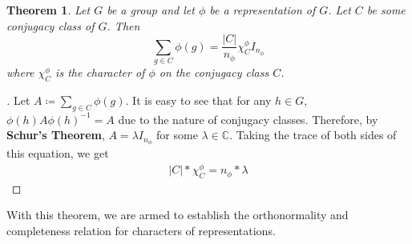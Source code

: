 \documentclass[10pt]{ucthesis}
\newcommand{\C}{\mathbb{C}}
\newtheorem{theorem}[definition]{Theorem}
\begin{document}
\begin{theorem}
	Let $G$ be a group and let $\phi$ be a representation of $G$. Let $C$ be some conjugacy class of $G$. Then 
$$\sum_{g\in C} \phi(g) =\frac{|C|}{n_\phi} \chi^\phi_C I_{n_\phi}$$
where $\chi^\phi_C$ is the character of $\phi$ on the conjugacy class $C$.
\end{theorem}
\begin{proof}[\cite{Tung}] Let $A\coloneq \sum_{g\in C} \phi(g)$. It is easy to see that for any $h\in G$, $\phi(h)A\phi(h)^{-1} = A$ due to the nature of conjugacy classes. Therefore, by \textbf{Schur's Theorem}, $A = \lambda I_{n_\phi}$ for some $\lambda \in \C$. Taking the trace of both sides of this equation, we get 
\begin{equation}
	\begin{aligned}
		|C| * \chi_C^\phi = n_\phi * \lambda 
	\end{aligned}
\end{equation}
\end{proof}

With this theorem, we are armed to establish the orthonormality and completeness relation for characters of representations.
\end{document}
